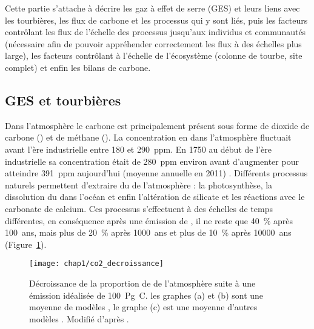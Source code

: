 Cette partie s'attache à décrire les gaz à effet de serre (GES) et leurs liens avec les tourbières, les flux de carbone et les processus qui y sont liés, puis les facteurs contrôlant les flux de l'échelle des processus jusqu'aux individus et communautés (nécessaire afin de pouvoir appréhender correctement les flux à des échelles plus large), les facteurs contrôlant à l'échelle de l'écosystème (colonne de tourbe, site complet) et enfin les bilans de carbone.


\subsection{GES et tourbières}

Dans l'atmosphère le carbone est principalement présent sous forme de dioxide de carbone (\coo) et de méthane (\chh).
La concentration en \coo dans l'atmosphère fluctuait avant l'ère industrielle entre 180 et \SI{290}{ppm}.
En 1750 au début de l'ère industrielle sa concentration était de \SI{280}{ppm} environ avant d'augmenter pour atteindre \SI{391}{ppm} aujourd'hui (moyenne annuelle en 2011) \citep{Ciais2014}.
Différents processus naturels permettent d'extraire du \coo de l'atmosphère : la photosynthèse, la dissolution du \coo dans l'océan et enfin l'altération de silicate et les réactions avec le carbonate de calcium.
Ces processus s'effectuent à des échelles de temps différentes, en conséquence après une émission de \coo, il ne reste que \SI{40}{\percent} après \SI{100}{ans}, mais plus de \SI{20}{\percent} après \SI{1000}{ans} et plus de \SI{10}{\percent} après \SI{10000}{ans} \citep{joos2013,Ciais2014} (Figure~\ref{fig:co2_decroissance}).

\begin{figure}
\centering
\texttt{[image: chap1/co2\_decroissance]}
\caption{Décroissance de la proportion de \coo de l'atmosphère suite à une émission idéalisée de \SI{100}{\peta\gram C}. les graphes (a) et (b) sont une moyenne de modèles \citep{joos2013}, le graphe (c) est une moyenne d'autres modèles \citep{archer2009}. Modifié d'après \citep{Ciais2014}.}
\label{fig:co2_decroissance}
\end{figure}



